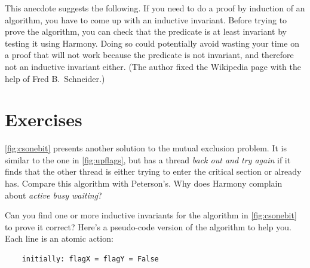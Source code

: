 \documentclass{report}
\newenvironment{code}{
\tcolorbox
}{
\endtcolorbox
}
\begin{document}
This anecdote suggests the following.  If you need to do a proof by induction
of an algorithm, you have to come up with an inductive invariant.
Before trying to prove the algorithm, you can check that the predicate is
at least invariant by testing it using Harmony.  Doing so could potentially
avoid wasting your time on a proof that will not work because the
predicate is not invariant, and therefore not an inductive invariant either.
(The author fixed the Wikipedia page with the help of Fred B.~Schneider.)

\section*{Exercises}
\begin{problems}
\item \autoref{fig:csonebit} presents another solution to the
mutual exclusion problem.  It is similar to the one in
\autoref{fig:upflags}, but has a thread \emph{back out and try again}
if it finds that the other thread is either trying to enter the critical
section or already has.  Compare this algorithm with Peterson's.
Why does Harmony complain about \emph{active busy waiting}?
\item
Can you find one or more inductive invariants for the algorithm in
\autoref{fig:csonebit} to prove it correct?
Here's a pseudo-code version of the algorithm to help you.  Each line
is an atomic action:
\begin{code}
\begin{verbatim}
    initially: flagX = flagY = False


\end{verbatim}
\end{code}
\end{problems}
\end{document}
